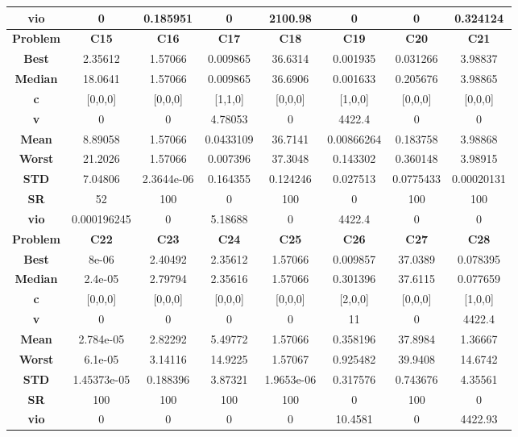 \documentclass{IEEEtran}
\begin{document}
\begin{center}
\begin{tabular}{|c|c|c|c|c|c|c|c|}
    \textbf{vio} & 0 & 0.185951 & 0 & 2100.98 & 0 & 0 & 0.324124\\ 
    \hline 
    \hline 
    \textbf{Problem} & \textbf{C15} & \textbf{C16} & \textbf{C17} & \textbf{C18} & \textbf{C19} & \textbf{C20} & \textbf{C21} \\ 
    \hline\hline 
    \textbf{Best} & 2.35612 & 1.57066 & 0.009865 & 36.6314 & 0.001935 & 0.031266 & 3.98837\\ 
    \textbf{Median} & 18.0641 & 1.57066 & 0.009865 & 36.6906 & 0.001633 & 0.205676 & 3.98865\\ 
    \textbf{c} & [0,0,0] & [0,0,0] & [1,1,0] & [0,0,0] & [1,0,0] & [0,0,0] & [0,0,0]\\ 
    \textbf{v} & 0 & 0 & 4.78053 & 0 & 4422.4 & 0 & 0\\ 
    \textbf{Mean} & 8.89058 & 1.57066 & 0.0433109 & 36.7141 & 0.00866264 & 0.183758 & 3.98868\\ 
    \textbf{Worst} & 21.2026 & 1.57066 & 0.007396 & 37.3048 & 0.143302 & 0.360148 & 3.98915\\ 
    \textbf{STD} & 7.04806 & 2.3644e-06 & 0.164355 & 0.124246 & 0.027513 & 0.0775433 & 0.00020131\\ 
    \textbf{SR} & 52 & 100 & 0 & 100 & 0 & 100 & 100\\ 
    \textbf{vio} & 0.000196245 & 0 & 5.18688 & 0 & 4422.4 & 0 & 0\\ 
    \hline 
    \hline 
    \textbf{Problem} & \textbf{C22} & \textbf{C23} & \textbf{C24} & \textbf{C25} & \textbf{C26} & \textbf{C27} & \textbf{C28} \\ 
    \hline\hline 
    \textbf{Best} & 8e-06 & 2.40492 & 2.35612 & 1.57066 & 0.009857 & 37.0389 & 0.078395\\ 
    \textbf{Median} & 2.4e-05 & 2.79794 & 2.35616 & 1.57066 & 0.301396 & 37.6115 & 0.077659\\ 
    \textbf{c} & [0,0,0] & [0,0,0] & [0,0,0] & [0,0,0] & [2,0,0] & [0,0,0] & [1,0,0]\\ 
    \textbf{v} & 0 & 0 & 0 & 0 & 11 & 0 & 4422.4\\ 
    \textbf{Mean} & 2.784e-05 & 2.82292 & 5.49772 & 1.57066 & 0.358196 & 37.8984 & 1.36667\\ 
    \textbf{Worst} & 6.1e-05 & 3.14116 & 14.9225 & 1.57067 & 0.925482 & 39.9408 & 14.6742\\ 
    \textbf{STD} & 1.45373e-05 & 0.188396 & 3.87321 & 1.9653e-06 & 0.317576 & 0.743676 & 4.35561\\ 
    \textbf{SR} & 100 & 100 & 100 & 100 & 0 & 100 & 0\\ 
    \textbf{vio} & 0 & 0 & 0 & 0 & 10.4581 & 0 & 4422.93\\ 
    \hline 
  \end{tabular}
\end{center}
\newpage
\end{document}
